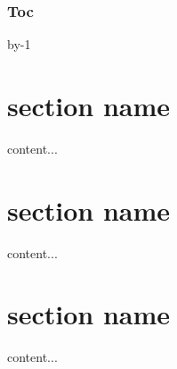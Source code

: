 \documentclass{beamer}
\makeatletter
\newcommand{\trickbeamer}{%
        \advance\beamer@slideinframe by-1%
        }%
\makeatother
\begin{document}
\begin{frame}
        \frametitle{Toc}

        \pause
        \trickbeamer

    \tableofcontents[pausesections]
\end{frame}


\section{section name}
\begin{frame}
content...
\end{frame}


\section{section name}
\begin{frame}
content...
\end{frame}


\section{section name}
\begin{frame}
content...
\end{frame}
\end{document}
